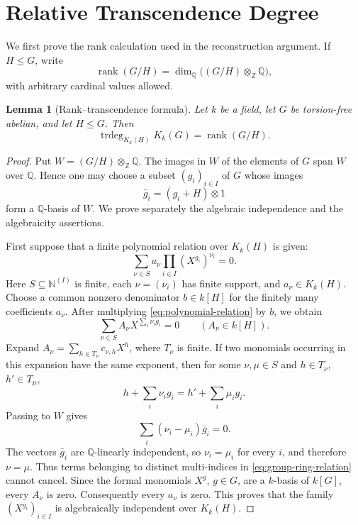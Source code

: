 \documentclass[11pt,a4paper]{article}
\numberwithin{equation}{section}
\theoremstyle{plain}
\newtheorem{lemma}[theorem]{Lemma}
\theoremstyle{definition}
\theoremstyle{remark}
\newcommand{\Q}{\mathbb Q}
\newcommand{\Z}{\mathbb Z}
\newcommand{\N}{\mathbb N}
\newcommand{\trdeg}{\operatorname{trdeg}}
\newcommand{\rk}{\operatorname{rank}}
\newcommand{\Kk}[1]{K_k(#1)}
\newcommand{\mon}[1]{X^{#1}}
\begin{document}
\section{Relative Transcendence Degree}

We first prove the rank calculation used in the reconstruction argument.
If $H\leq G$, write
\[
  \rk(G/H)=\dim_{\Q}\bigl((G/H)\otimes_{\Z}\Q\bigr),
\]
with arbitrary cardinal values allowed.

\begin{lemma}[Rank--transcendence formula]\label{lem:rank-trdeg}
Let $k$ be a field, let $G$ be torsion-free abelian, and let $H\leq G$.
Then
\[
  \trdeg_{\Kk H}\Kk G=\rk(G/H).
\]
\end{lemma}

\begin{proof}
Put $W=(G/H)\otimes_{\Z}\Q$.  The images in $W$ of the elements of $G$
span $W$ over $\Q$.  Hence one may choose a subset $(g_i)_{i\in I}$ of
$G$ whose images
\[
  \bar g_i=(g_i+H)\otimes 1
\]
form a $\Q$-basis of $W$.  We prove separately the algebraic independence
and the algebraicity assertions.

First suppose that a finite polynomial relation over $\Kk H$ is given:
\begin{equation}\label{eq:polynomial-relation}
  \sum_{\nu\in S} a_\nu\prod_{i\in I}(\mon{g_i})^{\nu_i}=0.
\end{equation}
Here $S\subseteq\N^{(I)}$ is finite, each $\nu=(\nu_i)$ has finite support,
and $a_\nu\in\Kk H$.  Choose a common nonzero denominator $b\in k[H]$
for the finitely many coefficients $a_\nu$.  After multiplying
\cref{eq:polynomial-relation} by $b$, we obtain
\begin{equation}\label{eq:group-ring-relation}
  \sum_{\nu\in S} A_\nu\mon{\sum_i\nu_i g_i}=0
  \qquad(A_\nu\in k[H]).
\end{equation}
Expand $A_\nu=\sum_{h\in T_\nu}c_{\nu,h}\mon h$, where $T_\nu$ is finite.
If two monomials occurring in this expansion have the same exponent, then
for some $\nu,\mu\in S$ and $h\in T_\nu$, $h'\in T_\mu$,
\[
  h+\sum_i\nu_i g_i=h'+\sum_i\mu_i g_i.
\]
Passing to $W$ gives
\[
  \sum_i(\nu_i-\mu_i)\bar g_i=0.
\]
The vectors $\bar g_i$ are $\Q$-linearly independent, so $\nu_i=\mu_i$
for every $i$, and therefore $\nu=\mu$.  Thus terms belonging to distinct
multi-indices in \cref{eq:group-ring-relation} cannot cancel.  Since the
formal monomials $\mon g$, $g\in G$, are a $k$-basis of $k[G]$, every
$A_\nu$ is zero.  Consequently every $a_\nu$ is zero.  This proves that
the family $(\mon{g_i})_{i\in I}$ is algebraically independent over
$\Kk H$.


\end{proof}
\end{document}
